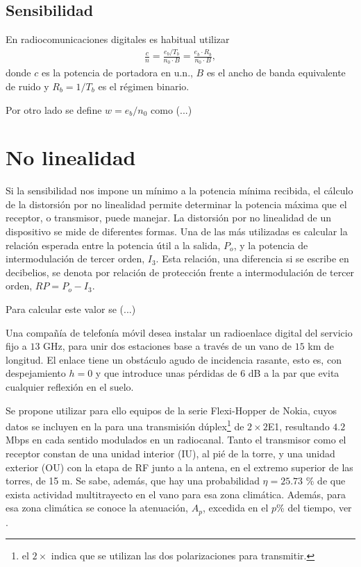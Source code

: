 \subsection{Sensibilidad}


En radiocomunicaciones digitales es habitual utilizar \cite{Hernando08}
\begin{align}
    \frac{c}{n}=\frac{e_b/T_b}{n_0\cdot B}=\frac{e_b\cdot R_b}{n_0\cdot B},
\end{align}
donde $c$ es la potencia de portadora en u.n., $B$ es el ancho de banda equivalente de ruido y
$R_b=1/T_b$ es el régimen binario. 

Por otro lado se define $w=e_b/n_0$ como (...)

\section{No linealidad}
Si la sensibilidad nos impone un mínimo a la potencia mínima recibida, el cálculo de la distorsión por no linealidad permite determinar la potencia máxima que el receptor, o transmisor, puede manejar. 
La distorsión por no linealidad de un dispositivo se mide de diferentes formas. Una de las más utilizadas es calcular la relación esperada entre la potencia útil a la salida, $P_o$, y la potencia de intermodulación de tercer orden, $I_3$. Esta relación, una diferencia si se escribe en decibelios, se denota por relación de protección frente a intermodulación de tercer orden, $RP=P_o-I_3$.

Para calcular este valor se (...)



Una compañía de telefonía móvil desea instalar un radioenlace digital del servicio fijo a $13$ GHz, para unir dos estaciones base a través de un vano de $15$ km de longitud. El enlace tiene un obstáculo agudo de incidencia rasante, esto es, con despejamiento $h=0$ y que introduce unas pérdidas de 6 dB a la par que evita cualquier reflexión en el suelo. 

Se propone utilizar para ello equipos de la serie Flexi-Hopper de Nokia, cuyos datos se incluyen en la  para una transmisión dúplex\footnote{ el $2\times$ indica que se utilizan las dos polarizaciones para transmitir.} de $2 \times 2$E1, resultando $4.2$ Mbps en cada sentido modulados en un radiocanal. Tanto el transmisor como el receptor constan de una unidad interior (IU), al pié de la torre, y una unidad exterior (OU) con la etapa de RF junto a la antena, en el extremo superior de las torres, de 15 m. Se sabe, además, que hay una probabilidad $\eta = 25.73$ \% de que exista actividad multitrayecto en el vano para esa zona climática. Además, para esa zona climática se conoce la atenuación, $A_p$, excedida en el $p$\% del tiempo, ver . 


